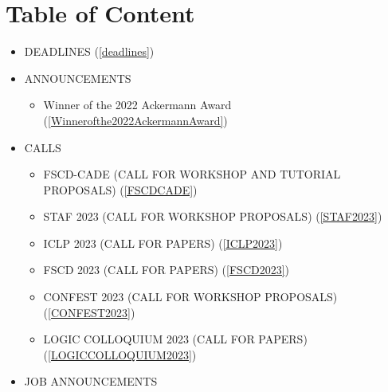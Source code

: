 \documentclass[prodmode,acmtecs]{acmsmall} %
\begin{document}
\section{Table of Content}\begin{itemize}\item DEADLINES (\cref{deadlines}) 
 
\item ANNOUNCEMENTS 
 
\begin{itemize}\item Winner of the 2022 Ackermann Award (\cref{Winnerofthe2022AckermannAward})
\end{itemize} 
\item CALLS 
 
\begin{itemize}\item FSCD-CADE (CALL FOR WORKSHOP AND TUTORIAL PROPOSALS) (\cref{FSCDCADE})
\item STAF 2023 (CALL FOR WORKSHOP PROPOSALS) (\cref{STAF2023})
\item ICLP 2023 (CALL FOR PAPERS) (\cref{ICLP2023})
\item FSCD 2023 (CALL FOR PAPERS) (\cref{FSCD2023})
\item CONFEST 2023 (CALL FOR WORKSHOP PROPOSALS) (\cref{CONFEST2023})
\item LOGIC COLLOQUIUM 2023 (CALL FOR PAPERS) (\cref{LOGICCOLLOQUIUM2023})
\end{itemize} 
\item JOB ANNOUNCEMENTS 
 

\end{itemize}
\end{document}
